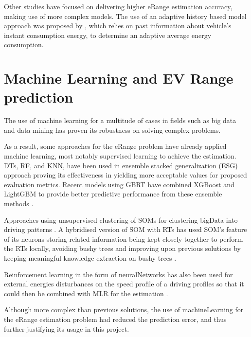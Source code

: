 Other studies have focused on delivering 
higher \gls{eRange} estimation accuracy,
making use of more complex models. 
The use of an adaptive history based model 
approach was proposed by \cite{classicEVX},
which relies on past information about
vehicle's instant consumption energy, to determine an
adaptive average energy consumption.

\section{Machine Learning and EV Range prediction}
\label{sec:stateOfArtML}

The use of machine learning for a multitude
of cases \citep{machineLearningCaseStudy} in fields such as 
big data \citep{machineLearningBigData, machineLearningBigData2}
and data mining \citep{businessDataMining} has 
proven its robustness on solving complex problems.


As a result, some approaches for the \gls{eRange}
problem have already applied machine learning,
most notably supervised learning to achieve the estimation.
\Glspl{DT}, \gls{RF}, and \gls{KNN}, have been 
used in ensemble stacked generalization (ESG) approach 
\citep{eRangeMachineLearningEnsemble} proving its 
effectiveness in yielding more acceptable values
for proposed evaluation metrics.
Recent models using \gls{GBRT} have
combined \gls{XGBoost} and \gls{LightGBM} 
to provide better predictive performance
from these ensemble methods 
\citep{machineLearningERangeGradientBoostRts}.

Approaches using unsupervised clustering 
of \glspl{SOM} for clustering \gls{bigData} 
into driving patterns \citep{eRangeMachineLearningGHSOM}.
A hybridised version of \gls{SOM} with \glspl{RT} 
has used \gls{SOM}'s feature of its neurons
storing related information being kept closely together
to perform the \glspl{RT} locally, avoiding 
bushy trees and improving upon previous solutions by
keeping meaningful knowledge extraction on bushy trees
\citep{machineLearningERangeSOMandRts}.

Reinforcement learning in the form of \gls{neuralNetworks}
has also been used for external energies 
disturbances on the speed profile of a driving profiles 
so that it could then be combined with \gls{MLR} 
for the estimation \citep{eRangeMachineLearningNeuralnetworkMLR}.

Although more complex than previous solutions, 
the use of \gls{machineLearning} for the 
\gls{eRange} estimation problem had reduced 
the prediction error, and thus further justifying
its usage in this project.  


